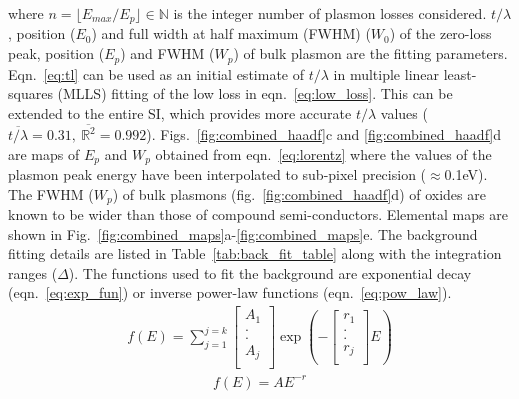 \documentclass[%
aip,
rsi,%
 amsmath,amssymb,%
 reprint,%
]{revtex4-1}
\begin{document}
where $n = \lfloor E_{max}/E_p \rfloor \in \mathbb{N}$ is the integer number of plasmon losses considered. $t/\lambda$, position ($E_0$) and full width at half maximum (FWHM) ($W_0$) of the zero-loss peak, position ($E_p$) and FWHM ($W_p$) of bulk plasmon are the fitting parameters. Eqn.~\ref{eq:tl} can be used as an initial estimate of $t/\lambda$ in multiple linear least-squares (MLLS) fitting of the low loss in eqn.~\ref{eq:low_loss}. This can be extended to the entire SI, which provides more accurate $t/\lambda$ values ($\overline{t/\lambda}=0.31,~\overline{\mathbb{R}^2}=0.992$). Figs.~\ref{fig:combined_haadf}c and \ref{fig:combined_haadf}d are maps of $E_p$ and $W_p$ obtained from eqn.~\ref{eq:lorentz} where the values of the plasmon peak energy have been interpolated to sub-pixel precision ($\approx$0.1eV). The FWHM  ($W_p$) of bulk plasmons (fig.~\ref{fig:combined_haadf}d) of oxides are known to be wider than those of compound semi-conductors. Elemental maps are shown in Fig.~\ref{fig:combined_maps}a-\ref{fig:combined_maps}e. The background fitting details are listed in Table~\ref{tab:back_fit_table} along with the integration ranges ($\Delta$). The functions used to fit the background are exponential decay (eqn.~\ref{eq:exp_fun}) or inverse power-law functions (eqn.~\ref{eq:pow_law}).
\begin{eqnarray}
	f(E) =
    \sum^{j=k}_{j=1}
    \left[
    \begin{array}{c}
    	A_1 	\\
        . 		\\
        . 		\\
        A_j 	\\
    \end{array}
    \right]
    \operatorname{exp}\left(-\left[
    \begin{array}{c}
    	r_1 	\\
        . 		\\
        . 		\\
        r_j 	\\
    \end{array}
    \right]E\right)
    \label{eq:exp_fun}
\end{eqnarray}
\begin{eqnarray}
	f(E) = AE^{-r}
    \label{eq:pow_law}
\end{eqnarray}
\end{document}
